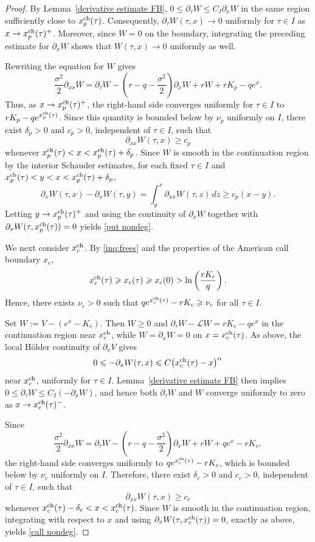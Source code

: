 \documentclass[11pt, a4paper, leqno]{amsart}
\numberwithin{equation}{section}
\theoremstyle{plain}
\theoremstyle{definition}
\theoremstyle{remark}
\def\leq{\leqslant}
\def\geq{\geqslant}
\begin{document}
{\begin{proof}
By Lemma~\ref{derivative estimate FB},
$0\leq\partial_\tau W\leq C_I\partial_xW$ in the same region sufficiently close to $x_p^{\rm ch}(\tau)$.
Consequently, $\partial_\tau W(\tau,x)\to0$ uniformly for
$\tau\in I$ as $x\to x_p^{\rm ch}(\tau)^+$. Moreover, since
$W=0$ on the boundary, integrating the preceding estimate for
$\partial_xW$ shows that $W(\tau,x)\to0$ uniformly as well.

Rewriting the equation for $W$ gives
\[
    \frac{\sigma^2}{2}\partial_{xx}W
    =
    \partial_\tau W
    -
    \left(r-q-\frac{\sigma^2}{2}\right)\partial_xW
    +rW+rK_p-qe^x.
\]
Thus, as $x\to x_p^{\rm ch}(\tau)^+$, the right-hand side converges
uniformly for $\tau\in I$ to
$rK_p-qe^{x_p^{\rm ch}(\tau)}$. Since this quantity is bounded below
by $\nu_p$ uniformly on $I$, there exist $\delta_p>0$ and $c_p>0$,
independent of $\tau\in I$, such that
\[
    \partial_{xx}W(\tau,x)\geq c_p
\]
whenever
$x_p^{\rm ch}(\tau)<x<x_p^{\rm ch}(\tau)+\delta_p$.
{
Since $W$ is smooth in the continuation region by the interior
Schauder estimates, for each fixed $\tau\in I$ and
$x_p^{\rm ch}(\tau)<y<x<x_p^{\rm ch}(\tau)+\delta_p$,
\[
    \partial_xW(\tau,x)-\partial_xW(\tau,y)
    =
    \int_y^x\partial_{xx}W(\tau,z)\,dz
    \geq c_p(x-y).
\]
Letting $y\to x_p^{\rm ch}(\tau)^+$ and using the continuity of
$\partial_xW$ together with
$\partial_xW(\tau,x_p^{\rm ch}(\tau))=0$ yields
\eqref{put nondeg}.}

We next consider $x_c^{\rm ch}$. By \eqref{inq:frees} and the
properties of the American call boundary $x_c$,
\[
    x_c^{\rm ch}(\tau)
    \geq x_c(\tau)
    \geq x_c(0)
    >
    \ln\left(\frac{rK_c}{q}\right).
\]
Hence, there exists $\nu_c>0$ such that
$qe^{x_c^{\rm ch}(\tau)}-rK_c\geq\nu_c$ for all $\tau\in I$.

Set $W:=V-(e^x-K_c)$. Then $W\geq0$ and
$\partial_\tau W-\mathcal LW=rK_c-qe^x$ in the continuation region
near $x_c^{\rm ch}$, while
$W=\partial_xW=0$ on $x=x_c^{\rm ch}(\tau)$.
As above, the local H\"older continuity of $\partial_xV$ gives
\[
    0\leq-\partial_xW(\tau,x)
    \leq C\bigl(x_c^{\rm ch}(\tau)-x\bigr)^\alpha
\]
near $x_c^{\rm ch}$, uniformly for $\tau\in I$.
Lemma~\ref{derivative estimate FB} then implies
$0\leq\partial_\tau W\leq C_I(-\partial_xW)$, and hence both
$\partial_\tau W$ and $W$ converge uniformly to zero as
$x\to x_c^{\rm ch}(\tau)^-$.

Since
\[
    \frac{\sigma^2}{2}\partial_{xx}W
    =
    \partial_\tau W
    -
    \left(r-q-\frac{\sigma^2}{2}\right)\partial_xW
    +rW+qe^x-rK_c,
\]
the right-hand side converges uniformly to
$qe^{x_c^{\rm ch}(\tau)}-rK_c$, which is bounded below by $\nu_c$
uniformly on $I$. Therefore, there exist $\delta_c>0$ and $c_c>0$,
independent of $\tau\in I$, such that
\[
    \partial_{xx}W(\tau,x)\geq c_c
\]
whenever
$x_c^{\rm ch}(\tau)-\delta_c<x<x_c^{\rm ch}(\tau)$.
Since $W$ is smooth in the continuation region, integrating with
respect to $x$ and using
$\partial_xW(\tau,x_c^{\rm ch}(\tau))=0$, exactly as above, yields
\eqref{call nondeg}.


\end{proof}}
\end{document}
